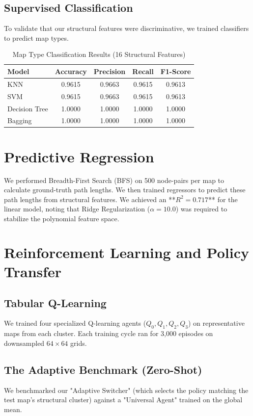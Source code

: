 \documentclass[12pt,a4paper]{article}
\begin{document}
\subsection{Supervised Classification}
To validate that our structural features were discriminative, we trained classifiers to predict map types.
\begin{table}[H]
\centering
\caption{Map Type Classification Results (16 Structural Features)}
\begin{tabular}{lcccc}
\toprule
Model & Accuracy & Precision & Recall & F1-Score \\
\midrule
KNN   & 0.9615 & 0.9663 & 0.9615 & 0.9613 \\
SVM   & 0.9615 & 0.9663 & 0.9615 & 0.9613 \\
Decision Tree & 1.0000 & 1.0000 & 1.0000 & 1.0000 \\
Bagging & 1.0000 & 1.0000 & 1.0000 & 1.0000 \\
\bottomrule
\end{tabular}
\end{table}

\section{Predictive Regression}
We performed Breadth-First Search (BFS) on 500 node-pairs per map to calculate ground-truth path lengths. We then trained regressors to predict these path lengths from structural features. We achieved an **$R^2 = 0.717$** for the linear model, noting that Ridge Regularization ($\alpha=10.0$) was required to stabilize the polynomial feature space.

\section{Reinforcement Learning and Policy Transfer}

\subsection{Tabular Q-Learning}
We trained four specialized Q-learning agents ($Q_0, Q_1, Q_2, Q_3$) on representative maps from each cluster. Each training cycle ran for 3,000 episodes on downsampled $64 \times 64$ grids.

\subsection{The Adaptive Benchmark (Zero-Shot)}
We benchmarked our "Adaptive Switcher" (which selects the policy matching the test map's structural cluster) against a "Universal Agent" trained on the global mean.
\end{document}
